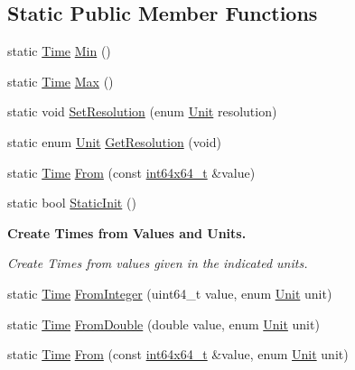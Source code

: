 \subsection*{Static Public Member Functions}
\begin{DoxyCompactItemize}
\item 
static \hyperlink{classns3_1_1Time}{Time} \hyperlink{classns3_1_1Time_a75169ee37c557c616eb79e1a15ed09b7}{Min} ()
\item 
static \hyperlink{classns3_1_1Time}{Time} \hyperlink{classns3_1_1Time_ad3414eb47d40a34971d5e78db88cfc72}{Max} ()
\item 
static void \hyperlink{classns3_1_1Time_ac89165ba7715b66017a49c718f4aef09}{Set\+Resolution} (enum \hyperlink{classns3_1_1Time_a87a7f4d29c68b047a72d291ad660295a}{Unit} resolution)
\item 
static enum \hyperlink{classns3_1_1Time_a87a7f4d29c68b047a72d291ad660295a}{Unit} \hyperlink{classns3_1_1Time_a1444f0f08b5e19f031157609e32fcf98}{Get\+Resolution} (void)
\item 
static \hyperlink{classns3_1_1Time}{Time} \hyperlink{classns3_1_1Time_a34e4acc13d0e08cc8cb9cd3b838b9baf}{From} (const \hyperlink{classint64x64__t}{int64x64\+\_\+t} \&value)
\item 
static bool \hyperlink{classns3_1_1Time_a6acd27caec34f9cb27e054d0fbfac19d}{Static\+Init} ()
\end{DoxyCompactItemize}
\begin{Indent}{\bf Create Times from Values and Units.}\par
{\em Create Times from values given in the indicated units. }\begin{DoxyCompactItemize}
\item 
static \hyperlink{classns3_1_1Time}{Time} \hyperlink{classns3_1_1Time_a3e742c67b2764e75ff95f9b754d43fe9}{From\+Integer} (uint64\+\_\+t value, enum \hyperlink{classns3_1_1Time_a87a7f4d29c68b047a72d291ad660295a}{Unit} unit)
\item 
static \hyperlink{classns3_1_1Time}{Time} \hyperlink{classns3_1_1Time_a60e845f4a74e62495b86356afe604cb4}{From\+Double} (double value, enum \hyperlink{classns3_1_1Time_a87a7f4d29c68b047a72d291ad660295a}{Unit} unit)
\item 
static \hyperlink{classns3_1_1Time}{Time} \hyperlink{classns3_1_1Time_a132d87a88dbff816f6aeea2d7244c3ae}{From} (const \hyperlink{classint64x64__t}{int64x64\+\_\+t} \&value, enum \hyperlink{classns3_1_1Time_a87a7f4d29c68b047a72d291ad660295a}{Unit} unit)
\end{DoxyCompactItemize}
\end{Indent}
